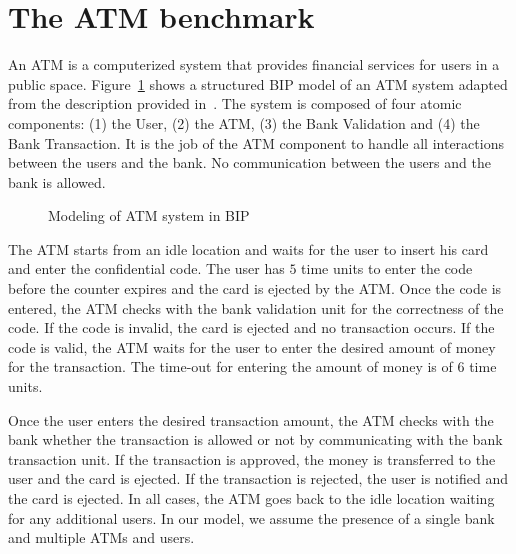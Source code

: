 \section{The ATM benchmark}
An ATM is a computerized system that provides financial services for users in 
a public space. 
Figure~\ref{fig:atm_bip} shows a structured BIP model of an ATM system adapted from the
description provided in~\cite{atm}.
The system is composed of four atomic components: (1) the User, (2) the ATM, (3) the Bank Validation 
and (4) the Bank Transaction. It is the job of the ATM component to handle all interactions between the 
users and the bank. No communication between the users and the bank is allowed. 
\begin{figure}[bt]
 \centering
  \resizebox{1.0\textwidth}{!}{
       
  }
  \caption{Modeling of ATM system in BIP} \vspace*{-0.5cm}
  \label{fig:atm_bip}
\end{figure}

The ATM starts from an idle location and waits for the user to insert his card 
and enter the confidential code. The user has $5$ time units
to enter the code before the counter expires and the card is ejected by the ATM. 
Once the code is entered, the ATM checks with the bank validation unit for 
the correctness of the code. If the code is invalid, the card is ejected
and no transaction occurs. If the code is valid, the ATM waits for the user to enter
the desired amount of money for the transaction. The time-out for entering the amount 
of money is of $6$ time units. 

Once the user enters the desired transaction amount, the ATM checks with the bank whether 
the transaction is allowed or not by communicating with the bank transaction unit.
If the transaction is approved, the money is transferred to the user and the card is ejected. 
If the transaction is rejected, the user is notified and the card is ejected. In all cases, 
the ATM goes back to the idle location waiting for any additional users. 
In our model, we assume the presence of a single bank and multiple ATMs and users. 

